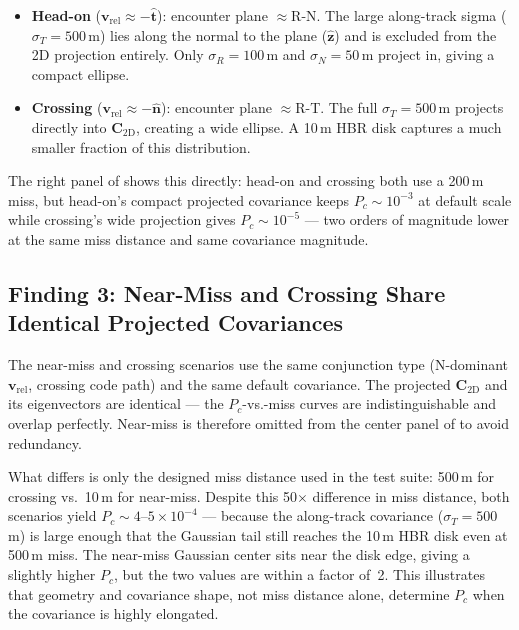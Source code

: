 \documentclass[11pt]{article}
\begin{document}
\begin{itemize}
  \item \textbf{Head-on} ($\mathbf{v}_\text{rel} \approx -\hat{\mathbf{t}}$):
    encounter plane $\approx$R-N.  The large along-track sigma ($\sigma_T = 500$\,m)
    lies along the normal to the plane ($\hat{\mathbf{z}}$) and is excluded
    from the 2D projection entirely.  Only $\sigma_R = 100$\,m and
    $\sigma_N = 50$\,m project in, giving a compact ellipse.
  \item \textbf{Crossing} ($\mathbf{v}_\text{rel} \approx -\hat{\mathbf{n}}$):
    encounter plane $\approx$R-T.  The full $\sigma_T = 500$\,m projects
    directly into $\mathbf{C}_\text{2D}$, creating a wide ellipse.
    A 10\,m HBR disk captures a much smaller fraction of this distribution.
\end{itemize}

The right panel of  shows this directly: head-on and
crossing both use a 200\,m miss, but head-on's compact projected covariance
keeps $P_c \sim 10^{-3}$ at default scale while crossing's wide projection
gives $P_c \sim 10^{-5}$ — two orders of magnitude lower at the same miss
distance and same covariance magnitude.

\subsection{Finding 3: Near-Miss and Crossing Share Identical Projected Covariances}

The near-miss and crossing scenarios use the same conjunction type (N-dominant
$\mathbf{v}_\text{rel}$, crossing code path) and the same default covariance.
The projected $\mathbf{C}_\text{2D}$ and its eigenvectors are identical — the
$P_c$-vs.-miss curves are indistinguishable and overlap perfectly.  Near-miss
is therefore omitted from the center panel of  to avoid
redundancy.

What differs is only the designed miss distance used in the test suite: 500\,m
for crossing vs.\ 10\,m for near-miss.  Despite this 50$\times$ difference in
miss distance, both scenarios yield $P_c \sim 4\text{--}5\times10^{-4}$ — because
the along-track covariance ($\sigma_T = 500$\,m) is large enough that the
Gaussian tail still reaches the 10\,m HBR disk even at 500\,m miss.  The near-miss
Gaussian center sits near the disk edge, giving a slightly higher $P_c$, but the
two values are within a factor of~2.  This illustrates that geometry and covariance
shape, not miss distance alone, determine $P_c$ when the covariance is highly
elongated.
\end{document}
